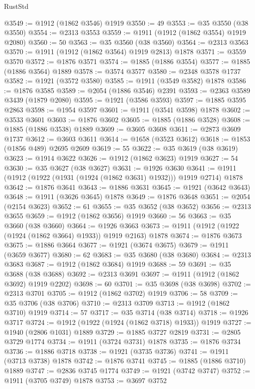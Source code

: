 \begin{lexlean}{RustStd}
\begin{coremodule}
{\begin{coremodule}
{{{{{{{{{{{{{{{{{{{{{{{{{{{{{@3549 := @1912 (@1862 @3546) @1919
@3550 := 49
@3553 := @35 @3550 (@38 @3550)
@3554 := @2313 @3553
@3559 := @1911 (@1912 (@1862 @3554) @1919 @2080)
@3560 := 50
@3563 := @35 @3560 (@38 @3560)
@3564 := @2313 @3563
@3570 := @1911 (@1912 (@1862 @3564) @1919 @2813) @1878
@3571 := @3559 @3570
@3572 := @1876 @3571
@3574 := @1885 (@1886 @3554)
@3577 := @1885 (@1886 @3564) @1889
@3578 := @3574 @3577
@3580 := @2348 @3578 @1737
@3582 := @1921 (@3572 @3580)
@3585 := @1911 (@3549 @3582) @1878
@3586 := @1876 @3585
@3589 := @2054 (@1886 @3546) @2391
@3593 := @2363 @3589 @3439 (@1879 @2080)
@3595 := @1921 (@3586 @3593)
@3597 := @1885 @3595 @2863
@3598 := @1954 @3597
@3601 := @1911 (@3541 @3598) @1878
@3602 := @3533 @3601
@3603 := @1876 @3602
@3605 := @1885 (@1886 @3528)
@3608 := @1885 (@1886 @3538) @1889
@3609 := @3605 @3608
@3611 := @2873 @3609 @1737
@3612 := @3603 @3611
@3614 := @1658 (@3523 @3612)
@3618 := @1853 (@1856 @489) @2695 @2609
@3619 := 55
@3622 := @35 @3619 (@38 @3619)
@3623 := @1914 @3622
@3626 := @1912 (@1862 @3623) @1919
@3627 := 54
@3630 := @35 @3627 (@38 @3627)
@3631 := @1926 @3630
@3641 := @1911 (@1912 (@1922 (@1931 (@1924 (@1862 @3631) @1932))) @1919 @2714) @1878
@3642 := @1876 @3641
@3643 := @1886 @3631
@3645 := @1921 (@3642 @3643)
@3648 := @1911 (@3626 @3645) @1878
@3649 := @1876 @3648
@3651 := @2054 (@2154 @3623)
@3652 := 61
@3655 := @35 @3652 (@38 @3652)
@3656 := @2313 @3655
@3659 := @1912 (@1862 @3656) @1919
@3660 := 56
@3663 := @35 @3660 (@38 @3660)
@3664 := @1926 @3663
@3673 := @1911 (@1912 (@1922 (@1924 (@1862 @3664) @1933)) @1919 @2163) @1878
@3674 := @1876 @3673
@3675 := @1886 @3664
@3677 := @1921 (@3674 @3675)
@3679 := @1911 (@3659 @3677)
@3680 := 62
@3683 := @35 @3680 (@38 @3680)
@3684 := @2313 @3683
@3687 := @1912 (@1862 @3684) @1919
@3688 := 59
@3691 := @35 @3688 (@38 @3688)
@3692 := @2313 @3691
@3697 := @1911 (@1912 (@1862 @3692) @1919 @2202)
@3698 := 60
@3701 := @35 @3698 (@38 @3698)
@3702 := @2313 @3701
@3705 := @1912 (@1862 @3702) @1919
@3706 := 58
@3709 := @35 @3706 (@38 @3706)
@3710 := @2313 @3709
@3713 := @1912 (@1862 @3710) @1919
@3714 := 57
@3717 := @35 @3714 (@38 @3714)
@3718 := @1926 @3717
@3724 := @1912 (@1922 (@1924 (@1862 @3718) @1933)) @1919
@3727 := @1940 (@2806 @1031) @1889
@3729 := @1885 @3727 @2819
@3731 := @2805 @3729 @1774
@3734 := @1911 (@3724 @3731) @1878
@3735 := @1876 @3734
@3736 := @1886 @3718
@3738 := @1921 (@3735 @3736)
@3741 := @1911 (@3713 @3738) @1878
@3742 := @1876 @3741
@3745 := @1885 (@1886 @3710) @1889
@3747 := @2836 @3745 @1774
@3749 := @1921 (@3742 @3747)
@3752 := @1911 (@3705 @3749) @1878
@3753 := @3697 @3752
}}}}}}}}}}}}}}}}}}}}}}}}}}}}}
\end{coremodule}}
\end{coremodule}
\end{lexlean}
